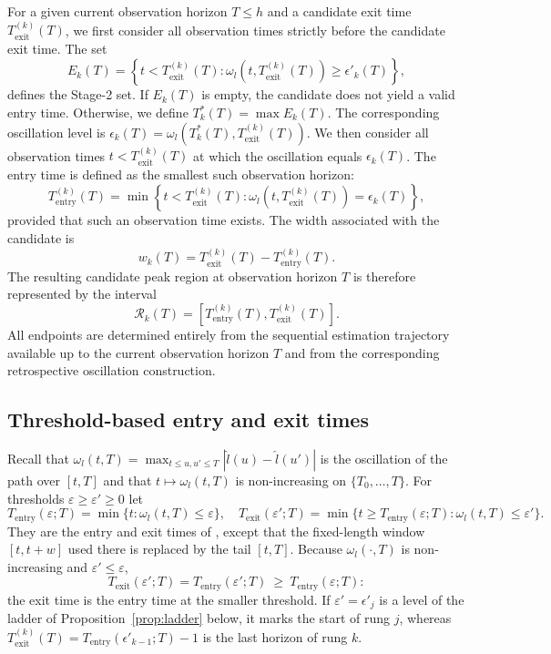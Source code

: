 \documentclass[12pt,a4paper]{article}
\begin{document}
For a given current observation horizon \(T\leq h\) and a candidate exit time
\(T_{\mathrm{exit}}^{(k)}(T)\), we first consider all observation times strictly before the candidate exit time. The set
\begin{equation}
	E_k(T)
	=
	\left\{
	t<T_{\mathrm{exit}}^{(k)}(T):
	\omega_l\left(t,T_{\mathrm{exit}}^{(k)}(T)\right)
	\geq
	\epsilon'_k(T)
	\right\},
	\label{eq:stage2_set}
\end{equation}
defines the Stage-2 set. If \(E_k(T)\) is empty, the candidate does not yield a valid entry time. Otherwise, we define
\(
T_k^*(T)=\max E_k(T).
\)
The corresponding oscillation level is
\(
\epsilon_k(T)
=
\omega_l\left(
T_k^*(T),T_{\mathrm{exit}}^{(k)}(T)
\right).
\)
We then consider all observation times \(t<T_{\mathrm{exit}}^{(k)}(T)\) at which the oscillation equals \(\epsilon_k(T)\). The entry time is defined as the smallest such observation horizon:
\begin{equation}
	T_{\mathrm{entry}}^{(k)}(T)
	=
	\min
	\left\{
	t<T_{\mathrm{exit}}^{(k)}(T):
	\omega_l\left(
	t,T_{\mathrm{exit}}^{(k)}(T)
	\right)
	=
	\epsilon_k(T)
	\right\},
	\label{eq:entry-time}
\end{equation}
provided that such an observation time exists.
The width associated with the candidate is
\begin{equation}
	w_k(T)
	=
	T_{\mathrm{exit}}^{(k)}(T)
	-
	T_{\mathrm{entry}}^{(k)}(T).
	\label{eq:peak_region_width}
\end{equation}
The resulting candidate peak region at observation horizon \(T\) is therefore represented by the interval
\[
\mathcal{R}_k(T)
=
\left[
T_{\mathrm{entry}}^{(k)}(T),
T_{\mathrm{exit}}^{(k)}(T)
\right].
\]
All endpoints are determined entirely from the sequential estimation trajectory available up to the current observation horizon \(T\) and from the corresponding retrospective oscillation construction.

\subsection{Threshold-based entry and exit times}
\label{subsec:threshold-entry}
Recall that $\omega_l(t,T)=\max_{t\le u,u'\le T}|\hat l(u)-\hat l(u')|$ is the
oscillation of the path over $[t,T]$ and that $t\mapsto\omega_l(t,T)$ is
non-increasing on $\{T_0,\dots,T\}$.
For thresholds $\varepsilon\ge\varepsilon'\ge0$ let
\[
T_{\mathrm{entry}}(\varepsilon;T)=\min\{t:\omega_l(t,T)\le\varepsilon\},\quad
T_{\mathrm{exit}}(\varepsilon';T)=\min\{t\ge T_{\mathrm{entry}}(\varepsilon;T):\omega_l(t,T)\le\varepsilon'\}.
\]
They are the entry and exit times of \citet{Der25}, except that the
fixed-length window $[t,t+w]$ used there is replaced by the tail $[t,T]$.
Because $\omega_l(\cdot,T)$ is non-increasing and $\varepsilon'\le\varepsilon$,
\[
T_{\mathrm{exit}}(\varepsilon';T)=T_{\mathrm{entry}}(\varepsilon';T)\ \ge\
T_{\mathrm{entry}}(\varepsilon;T):
\]
the exit time is the entry time at the smaller threshold. If
$\varepsilon'=\epsilon'_j$ is a level of the ladder of
Proposition~\ref{prop:ladder} below, it marks the start of rung $j$,
whereas $T_{\mathrm{exit}}^{(k)}(T)=T_{\mathrm{entry}}(\epsilon'_{k-1};T)-1$
is the last horizon of rung $k$.
\end{document}
